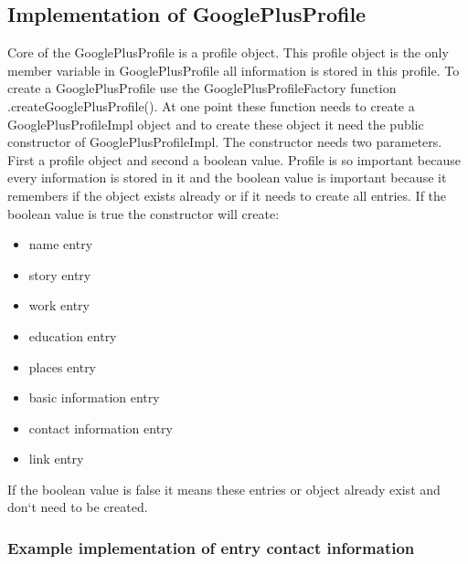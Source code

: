 \documentclass[12pt]{article}
\begin{document}
\subsection{Implementation of GooglePlusProfile}

Core of the GooglePlusProfile is a profile object. This profile object is the only member variable in GooglePlusProfile all information is stored in this profile. To create a GooglePlusProfile use the GooglePlusProfileFactory function .createGooglePlusProfile(). At one point these function needs to create a GooglePlusProfileImpl object and to create these object it need the public constructor of GooglePlusProfileImpl. The constructor needs two parameters. First a profile object and second a boolean value. Profile is so important because every information is stored in it and the boolean value is important because it remembers if the object exists already or if it needs to create all entries. If the boolean value is true the constructor will create:

\begin{itemize}
  \item name entry
  \item story entry
  \item work entry
  \item education entry
  \item places entry
  \item basic information entry
  \item contact information entry
  \item link entry
\end{itemize}

If the boolean value is false it means these entries or object already exist and don`t need to be created. 

\subsubsection{Example implementation of entry contact information}
\end{document}

